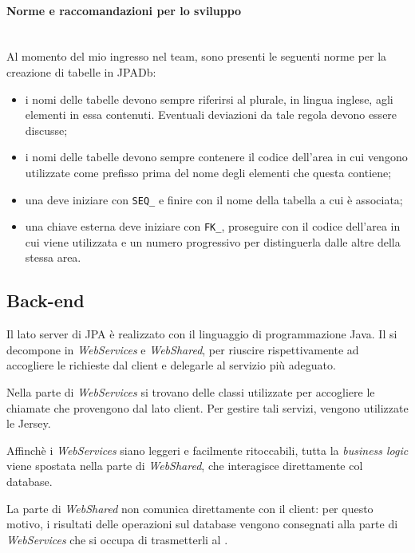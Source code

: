 \paragraph{Norme e raccomandazioni per lo sviluppo} \mbox{} \\

Al momento del mio ingresso nel team, sono presenti le seguenti norme per la
creazione di tabelle in JPADb:

\begin{itemize}
	\item i nomi delle tabelle devono sempre riferirsi al plurale, in lingua
	inglese, agli elementi in essa contenuti. Eventuali deviazioni da tale regola
	devono essere discusse;
	\item i nomi delle tabelle devono sempre contenere il codice dell'area in cui
	vengono utilizzate come prefisso prima del nome degli elementi che questa
	contiene;
	\item una  deve iniziare con \texttt{SEQ\_} e finire
	con il nome della tabella a cui è associata;
	\item una chiave esterna deve iniziare con \texttt{FK\_}, proseguire con il
	codice dell'area in cui viene utilizzata e un numero progressivo per
	distinguerla dalle altre della stessa area.
\end{itemize}

\subsection{Back-end}

Il lato server di JPA è realizzato con il linguaggio di programmazione Java.
Il \BKEND{} si decompone in \emph{WebServices} e \emph{WebShared}, per riuscire
rispettivamente ad accogliere le richieste dal client e delegarle al servizio
più adeguato.

Nella parte di \emph{WebServices} si trovano delle classi utilizzate per
accogliere le chiamate  che provengono dal lato client. Per gestire
tali servizi, vengono utilizzate le  Jersey.

Affinchè i \emph{WebServices} siano leggeri e facilmente ritoccabili, tutta la
\emph{business logic} viene spostata nella parte di \emph{WebShared}, che
interagisce direttamente col database.

La parte di \emph{WebShared} non comunica direttamente con il client: per
questo motivo, i risultati delle operazioni sul database vengono consegnati
alla parte di \emph{WebServices} che si occupa di trasmetterli al \FREND{}.


